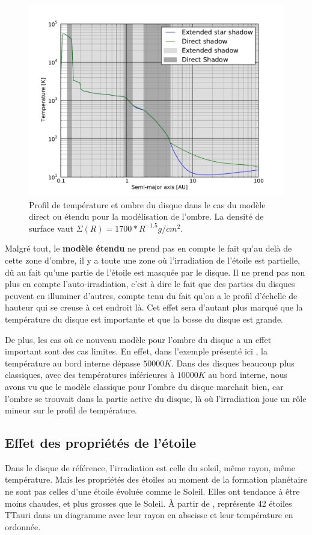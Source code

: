 \begin{figure}[htb]
\centering
\includegraphics[width=0.65\linewidth]{figure/shadow/example_shadow_temp_profile.pdf}
\caption{Profil de température et ombre du disque dans le cas du modèle direct ou étendu pour la modélisation de l'ombre. La densité de surface vaut $\Sigma(R) = 1700 * R^{-1.5}\unit{g/cm^2}$. }\label{fig:example_shadow_temp_profile}
\end{figure}

Malgré tout, le \textbf{modèle étendu} ne prend pas en compte le fait qu'au delà de cette zone d'ombre, il y a toute une zone où l'irradiation de l'étoile est partielle, dû au fait qu'une partie de l'étoile est masquée par le disque. Il ne prend pas non plus en compte l'auto-irradiation, c'est à dire le fait que des parties du disques peuvent en illuminer d'autres, compte tenu du fait qu'on a le profil d'échelle de hauteur qui se creuse à cet endroit là. Cet effet sera d'autant plus marqué que la température du disque est importante et que la bosse du disque est grande. 

De plus, les cas où ce nouveau modèle pour l'ombre du disque a un effet important sont des cas limites. En effet, dans l'exemple présenté ici , la température au bord interne dépasse $50 000\unit{K}$. Dans des disques beaucoup plus classiques, avec des températures inférieures à $10 000\unit{K}$ au bord interne, nous avons vu que le modèle classique pour l'ombre du disque marchait bien, car l'ombre se trouvait dans la partie active du disque, là où l'irradiation joue un rôle mineur sur le profil de température.

\subsection{Effet des propriétés de l'étoile}
Dans le disque de référence, l'irradiation est celle du soleil, même rayon, même température. Mais les propriétés des étoiles au moment de la formation planétaire ne sont pas celles d'une étoile évoluée comme le Soleil. Elles ont tendance à être moins chaudes, et plus grosses que le Soleil. À partir de \cite[Table 2]{hartigan1995disk},  représente 42 étoiles TTauri dans un diagramme avec leur rayon en abscisse et leur température en ordonnée. 

